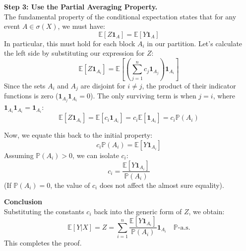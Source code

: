 \documentclass[12pt, a4paper]{article}
\theoremstyle{definition}
\begin{document}
\textbf{Step 3: Use the Partial Averaging Property.} \\
The fundamental property of the conditional expectation states that for any event $A \in \sigma(X)$, we must have:
\[ \mathbb{E}[Z \mathbf{1}_{A}] = \mathbb{E}[Y \mathbf{1}_{A}] \]
In particular, this must hold for each block $A_i$ in our partition. Let's calculate the left side by substituting our expression for $Z$:
\[ \mathbb{E}[Z \mathbf{1}_{A_i}] = \mathbb{E}\left[\left( \sum_{j=1}^n c_j \mathbf{1}_{A_j} \right) \mathbf{1}_{A_i}\right] \]
Since the sets $A_i$ and $A_j$ are disjoint for $i \neq j$, the product of their indicator functions is zero ($\mathbf{1}_{A_j}\mathbf{1}_{A_i} = 0$). The only surviving term is when $j = i$, where $\mathbf{1}_{A_i} \mathbf{1}_{A_i} = \mathbf{1}_{A_i}$:
\[ \mathbb{E}[Z \mathbf{1}_{A_i}] = \mathbb{E}[c_i \mathbf{1}_{A_i}] = c_i \mathbb{E}[\mathbf{1}_{A_i}] = c_i \mathbb{P}(A_i) \]

Now, we equate this back to the initial property:
\[ c_i \mathbb{P}(A_i) = \mathbb{E}[Y \mathbf{1}_{A_i}] \]
Assuming $\mathbb{P}(A_i) > 0$, we can isolate $c_i$:
\[ c_i = \frac{\mathbb{E}[Y \mathbf{1}_{A_i}]}{\mathbb{P}(A_i)} \]
(If $\mathbb{P}(A_i) = 0$, the value of $c_i$ does not affect the almost sure equality).

\textbf{Conclusion} \\
Substituting the constants $c_i$ back into the generic form of $Z$, we obtain:
\[ \mathbb{E}[Y|X] = Z = \sum_{i=1}^n \frac{\mathbb{E}[Y \mathbf{1}_{A_i}]}{\mathbb{P}(A_i)} \mathbf{1}_{A_i} \quad \mathbb{P}\text{-a.s.} \]
This completes the proof.
\end{document}

